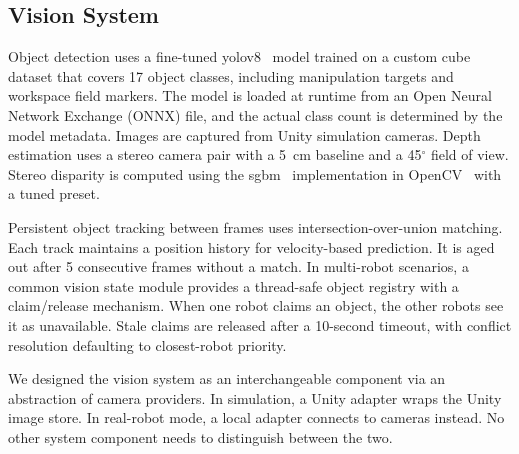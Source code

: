 \subsection{Vision System}
Object detection uses a fine-tuned \gls{yolo}v8~\cite{yolov8_ultralytics} model trained on a custom cube dataset that covers 17 object classes, including manipulation targets and workspace field markers. The model is loaded at runtime from an Open Neural Network Exchange (ONNX) file, and the actual class count is determined by the model metadata. Images are captured from Unity simulation cameras. Depth estimation uses a stereo camera pair with a 5~cm baseline and a 45$^\circ$ field of view. Stereo disparity is computed using the \gls{sgbm}~\cite{4359315} implementation in OpenCV~\cite{bradski2000opencv} with a tuned preset.

Persistent object tracking between frames uses intersection-over-union matching. Each track maintains a position history for velocity-based prediction. It is aged out after 5 consecutive frames without a match. In multi-robot scenarios, a common vision state module provides a thread-safe object registry with a claim/release mechanism. When one robot claims an object, the other robots see it as unavailable. Stale claims are released after a 10-second timeout, with conflict resolution defaulting to closest-robot priority.

We designed the vision system as an interchangeable component via an abstraction of camera providers. In simulation, a Unity adapter wraps the Unity image store. In real-robot mode, a local adapter connects to cameras instead. No other system component needs to distinguish between the two.


